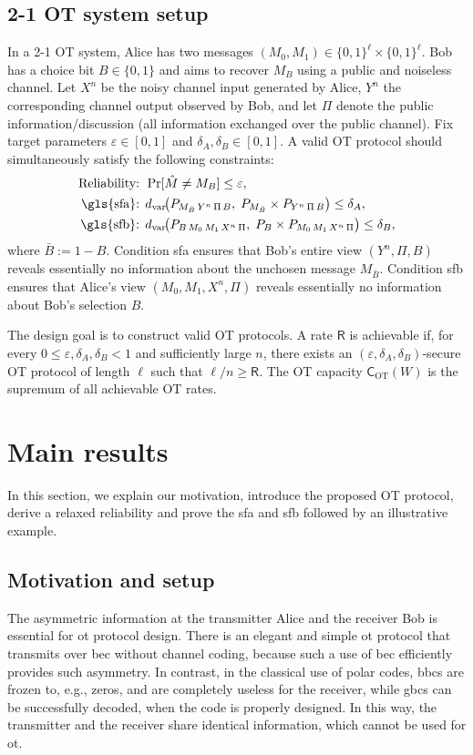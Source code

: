\documentclass[onecolumn]{IEEEtran} %
\newcommand{\1}{\mathbbm{1}}
\theoremstyle{boldremark}
\begin{document}
\subsection{2-1 OT system setup}
In a 2-1 OT system, Alice has two messages $(M_0,M_1)\in\{0,1\}^{\ell}\times\{0,1\}^{\ell}$.
Bob has a choice bit $B\in\{0,1\}$ and aims to recover $M_B$ using a public and noiseless channel.
Let $X^n$ be the noisy channel input generated by Alice, $Y^n$ the corresponding channel output observed by Bob,
and let $\Pi$ denote the public information/discussion (all information exchanged over the public channel). Fix target parameters $\varepsilon\in[0,1]$ and $\delta_A,\delta_B\in[0,1]$. A valid OT protocol should simultaneously satisfy the following constraints:
\begin{align}
\mbox{Reliability: }&\Pr[\hat{M} \neq M_B] \le \varepsilon,\label{EQ_reliability}\\
\mbox{\gls{sfa}: }&
d_{\mathrm{var}}\!\bigl(P_{M_{\bar{B}}\,Y^n\,\Pi\,B},\;P_{M_{\bar{B}}}\times P_{Y^n\,\Pi\,B}\bigr)
\le \delta_A,\label{EQ_SFA}\\
\mbox{\gls{sfb}: }&
d_{\mathrm{var}}\!\bigl(P_{B\,M_0\,M_1\,X^n\,\Pi},\;P_B \times P_{M_0\,M_1\,X^n\,\Pi}\bigr)
\le \delta_B,\label{EQ_SFB}
\end{align}
where $\bar{B}:=1-B$.
Condition \gls{sfa} ensures that Bob's entire view $(Y^n,\Pi,B)$ reveals essentially
no information about the unchosen message $M_{\bar{B}}$.
Condition \gls{sfb} ensures that Alice's view $(M_0,M_1,X^n,\Pi)$ reveals essentially
no information about Bob's selection $B$.

The design goal is to construct valid OT protocols.
A rate $\textsf{R}$ is achievable if, for every
$0 \le \varepsilon,\delta_A,\delta_B < 1$ and sufficiently large $n$, there exists an
$(\varepsilon,\delta_A,\delta_B)$-secure OT protocol of length $\ell$ such that
$\ell/n \ge \textsf{R}$.
The OT capacity $\textsf{C}_{\mathrm{OT}}(W)$ is the supremum of all achievable OT rates.

\section{Main results}
In this section, we explain our motivation, introduce the proposed OT protocol, derive a relaxed reliability and prove the \gls{sfa} and \gls{sfb} followed by an illustrative example.


\subsection{Motivation and setup}
The asymmetric information at the transmitter Alice and the receiver Bob is essential for \gls{ot} protocol design. There is an elegant and simple \gls{ot} protocol that transmits over \gls{bec} without channel coding, because such a use of \gls{bec} efficiently provides such asymmetry. In contrast, in the classical use of polar codes, \gls{bbcs} are frozen to, e.g., zeros, and are completely useless for the receiver, while \gls{gbcs} can be successfully decoded, when the code is properly designed. In this way, the transmitter and the receiver share identical information, which cannot be used for \gls{ot}.
\end{document}
